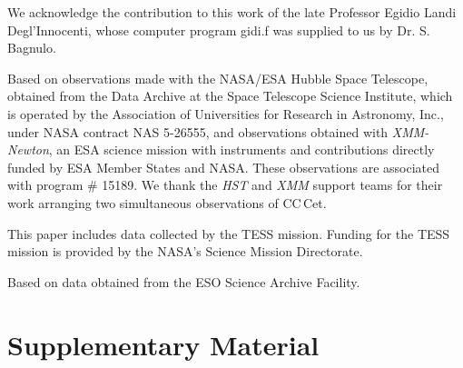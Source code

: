 \documentclass[fleqn,usenatbib]{mnras}
\begin{document}
We acknowledge the contribution to this work of the late Professor Egidio Landi Degl'Innocenti, whose computer program {\sc gidi.f} was supplied to us by Dr. S. Bagnulo.

Based on observations made with the NASA/ESA Hubble Space Telescope, obtained from the Data Archive at the Space Telescope Science Institute, which is operated by the Association of Universities for Research in Astronomy, Inc., under NASA contract NAS 5-26555, and observations obtained with \textit{XMM-Newton}, an ESA science mission with instruments and contributions directly funded by ESA Member States and NASA. These observations are associated with program \# 15189. We thank the {\em HST} and {\em XMM} support teams for their work arranging two simultaneous observations of CC\,Cet.

This paper includes data collected by the TESS mission. Funding for the TESS mission is provided by the NASA's Science Mission Directorate.

Based on data obtained from the ESO Science Archive Facility.










\appendix
\section{Supplementary Material}
\end{document}

